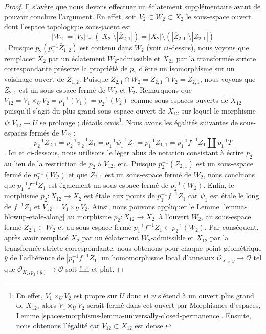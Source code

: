 \begin{proof}
\medskip\noindent
Il s'avère que nous devons effectuer un éclatement supplémentaire avant de pouvoir conclure l'argument. En effet, soit $V_2 \subset W_2 \subset X_2$ le sous-espace ouvert dont l'espace topologique sous-jacent est $$
|W_2| =
|V_2| \cup (|X_2| \setminus |\overline{Z}_{2, 1}|) =
|X_2| \setminus \left(|\overline{Z}_{2, 1}| \setminus |Z_{2, 1}|\right)
$$. Puisque $p_2(p_1^{-1}\overline{Z}_{1, 2})$ est contenu dans $W_2$ (voir ci-dessus), nous voyons que remplacer $X_2$ par un éclatement $W_2$-admissible et $X_{21}$ par la transformée stricte correspondante préserve la propriété de $p_1$ d'être un isomorphisme sur un voisinage ouvert de $\overline{Z}_{1, 2}$. Puisque $\overline{Z}_{2, 1} \cap W_2 = \overline{Z}_{2, 1} \cap V_2 = Z_{2, 1}$, nous voyons que $Z_{2, 1}$ est un sous-espace fermé de $W_2$ et $V_2$. Remarquons que $V_{12} = V_1 \times_U V_2 = p_1^{-1}(V_1) = p_2^{-1}(V_2)$ comme sous-espaces ouverts de $X_{12}$ puisqu'il s'agit du plus grand sous-espace ouvert de $X_{12}$ sur lequel le morphisme $\psi : V_{12} \to U$ se prolonge ; détails omis\footnote{En effet, $V_1 \times_U V_2$ est propre sur $U$ donc si $\psi$ s'étend à un ouvert plus grand de $X_{12}$, alors $V_1 \times_U V_2$ serait fermé dans cet ouvert par Morphismes d'espaces, Lemme \ref{spaces-morphisms-lemma-universally-closed-permanence}. Ensuite, nous obtenons l'égalité car $V_{12} \subset X_{12}$ est dense.}. Nous avons les égalités suivantes de sous-espaces fermés de $V_{12}$ : $$
p_2^{-1}Z_{2, 1} = p_2^{-1} \psi_2^{-1} Z_1 =
p_1^{-1} \psi_1^{-1} Z_1= p_1^{-1}Z_{1, 1} =
p_1^{-1}f^{-1}Z_1 \amalg p_1^{-1}T
$$. Ici et ci-dessous, nous utilisons le léger abus de notation consistant à écrire $p_2$ au lieu de la restriction de $p_2$ à $V_{12}$, etc. Puisque $p_2^{-1}(Z_{2, 1})$ est un sous-espace fermé de $p_2^{-1}(W_2)$ et que $Z_{2, 1}$ est un sous-espace fermé de $W_2$, nous concluons que $p_1^{-1}f^{-1}Z_1$ est également un sous-espace fermé de $p_2^{-1}(W_2)$. Enfin, le morphisme $p_2 : X_{12} \to X_2$ est \'etale aux points de $p_1^{-1}f^{-1}Z_1$ car $\psi_1$ est \'etale le long de $f^{-1}Z_1$ et $V_{12} = V_1 \times_U V_2$. Ainsi, nous pouvons appliquer le Lemme \ref{lemma-blowup-etale-along} au morphisme $p_2 : X_{12} \to X_2$, à l'ouvert $W_2$, au sous-espace fermé $Z_{2, 1} \subset W_2$ et au sous-espace fermé $p_1^{-1}f^{-1}Z_1 \subset p_2^{-1}(W_2)$. Par conséquent, après avoir remplacé $X_2$ par un éclatement $W_2$-admissible et $X_{12}$ par la transformée stricte correspondante, nous obtenons pour chaque point géométrique $\overline{y}$ de l'adhérence de $|p_1^{-1}f^{-1}Z_1|$ un homomorphisme local d'anneaux $\mathcal{O}_{X_{12}, \overline{y}} \to \mathcal{O}$ tel que $\mathcal{O}_{X_2, p_2(\overline{y})} \to \mathcal{O}$ soit fini et plat.


\end{proof}
